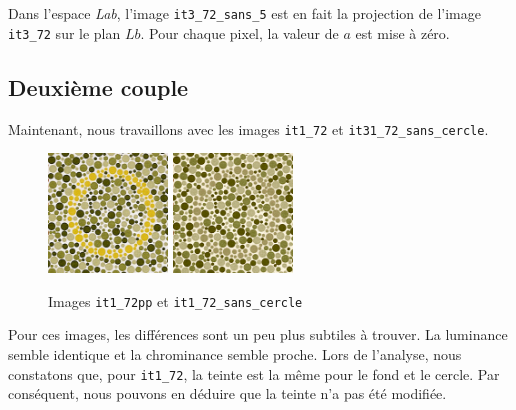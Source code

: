 \documentclass[a4paper,11pt]{article}
\begin{document}
Dans l'espace \textit{Lab}, l'image \texttt{it3\_72\_sans\_5} est en 
fait la projection de l'image \texttt{it3\_72} sur le plan $Lb$. Pour 
chaque pixel, la valeur de $a$ est mise à zéro.\\

\subsection{Deuxième couple}

Maintenant, nous travaillons avec les images \texttt{it1\_72} et 
\texttt{it31\_72\_sans\_cercle}.

\begin{figure}[H]
  \begin{center}  
    \includegraphics[width=120px]{images/it1_72pp.png}
    \includegraphics[width=120px]{images/it1_72pp_sans_cercle.png}
    \caption{Images \texttt{it1\_72pp} et \texttt{it1\_72\_sans\_cercle}}
  \end{center}
\end{figure}

Pour ces images, les différences sont un peu plus subtiles à trouver. 
La luminance semble identique et la chrominance semble proche. Lors 
de l'analyse, nous constatons que, pour \texttt{it1\_72}, la teinte est 
la même pour le fond et le cercle. Par conséquent, nous pouvons en 
déduire que la teinte n'a pas été modifiée.
\end{document}
